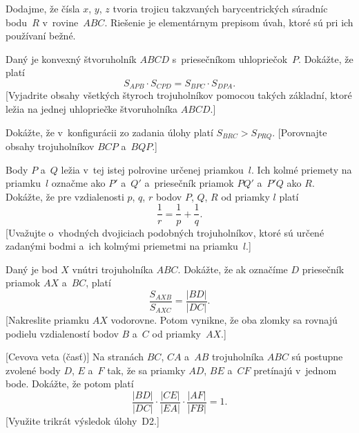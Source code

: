 {Dodajme, že čísla $x$, $y$, $z$ tvoria trojicu takzvaných barycentrických
súradníc bodu~$R$ v~rovine~$ABC$.
Riešenie je elementárnym prepisom úvah, ktoré sú pri ich používaní bežné.


Daný je konvexný štvoruholník $ABCD$ s~priesečníkom uhlopriečok~$P$. Dokážte, že platí
$$
S_{APB}\cdot S_{CPD} = S_{BPC}\cdot S_{DPA}.
$$
[Vyjadrite obsahy všetkých štyroch trojuholníkov pomocou takých
základní, ktoré ležia na jednej uhlopriečke štvoruholníka $ABCD$.]

Dokážte, že v~konfigurácii zo zadania úlohy platí $S_{BRC} >S_{PRQ}$.
[Porovnajte obsahy trojuholníkov $BCP$ a~$BQP$.]

\D
Body $P$ a~$Q$ ležia v~tej istej polrovine určenej priamkou~$l$. Ich kolmé priemety na priamku~$l$ označme ako $P'$ a~$Q'$
a~priesečník priamok $PQ'$ a~$P'Q$ ako $R$. Dokážte, že pre vzdialenosti $p$,
$q$, $r$ bodov $P$, $Q$, $R$ od priamky $l$ platí
$$
\frac{1}{r} = \frac{1}{p} + \frac{1}{q}.
$$
[Uvažujte o~vhodných dvojiciach podobných trojuholníkov, ktoré
sú určené zadanými bodmi a~ich kolmými priemetmi na priamku~$l$.]

Daný je bod $X$ vnútri trojuholníka $ABC$. Dokážte, že
ak označíme $D$ priesečník priamok $AX$ a~$BC$, platí
$$
\frac{S_{AXB}}{S_{AXC}} = \frac{|BD|}{|DC|}.
$$
[Nakreslite priamku $AX$ vodorovne. Potom vynikne, že oba zlomky sa rovnajú
podielu vzdialeností bodov $B$ a~$C$ od priamky~$AX$.]

[Cevova veta (časť)] Na stranách $BC$, $CA$ a~$AB$
trojuholníka $ABC$ sú postupne zvolené body $D$, $E$ a~$F$ tak, že sa
priamky $AD$, $BE$ a~$CF$ pretínajú v~jednom bode. Dokážte, že potom platí
$$
\frac{|BD|}{|DC|} \cdot\frac{|CE|}{|EA|} \cdot\frac{|AF|}{|FB|} = 1.
$$
[Využite trikrát výsledok úlohy~D2.]
}

